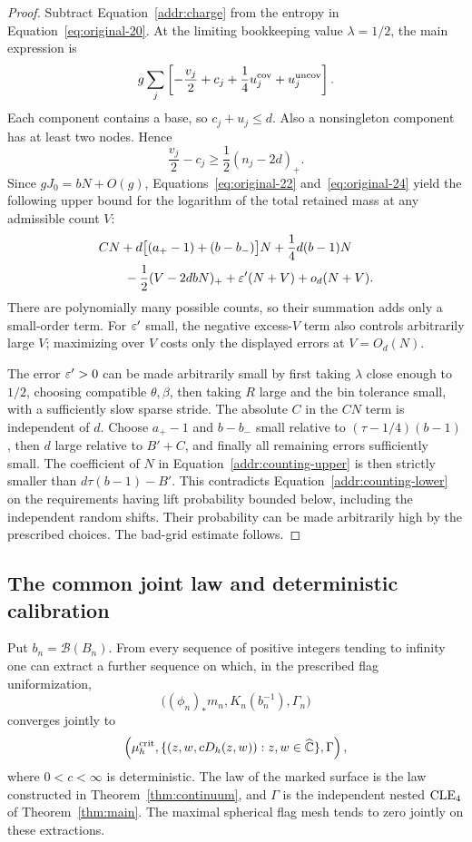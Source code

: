 \begin{proof}
Subtract Equation~\eqref{addr:charge} from the entropy in
Equation~\eqref{eq:original-20}.  At the limiting bookkeeping
value $\lambda=1/2$, the main expression is
\[
 g\sum_j\left[
        -\frac{v_j}{2}+c_j
        +\frac14u_j^{\rm cov}+u_j^{\rm uncov}
          \right].
\]
Each component contains a base, so $c_j+u_j\le d$.
Also a nonsingleton component has at least two nodes.  Hence
\[
             \frac{v_j}{2}-c_j
                    \ge \frac12(n_j-2d)_+.
\]
Since $gJ_0=bN+O(g)$, Equations~\eqref{eq:original-22}
and~\eqref{eq:original-24} yield the following upper bound
for the logarithm of the total retained mass at any admissible
count $V$:
\begin{equation}\label{addr:counting-upper}
\begin{split}
 &CN+d\bigl[(a_+-1)+(b-b_-)\bigr]N
       +\frac14d(b-1)N\\
 &\qquad-\frac12(V-2dbN)_+
       +\varepsilon'(N+V)+o_d(N+V).
\end{split}
\end{equation}
There are polynomially many possible counts, so their summation
adds only a small-order term.  For $\varepsilon'$ small, the negative
excess-$V$ term also controls arbitrarily large $V$; maximizing
over $V$ costs only the displayed errors at $V=O_d(N)$.

The error $\varepsilon'>0$ can be made arbitrarily small by first
taking $\lambda$ close enough to $1/2$, choosing compatible
$\theta,\beta$, then taking $R$ large and the bin tolerance
small, with a sufficiently slow sparse stride.  The absolute
$C$ in the $CN$ term is independent of $d$.
Choose $a_+-1$ and $b-b_-$ small relative to
$(\tau-1/4)(b-1)$, then $d$ large relative to $B'+C$,
and finally all remaining errors sufficiently small.  The
coefficient of $N$ in Equation~\eqref{addr:counting-upper}
is then strictly smaller than
$d\tau(b-1)-B'$.  This contradicts
Equation~\eqref{addr:counting-lower} on the requirements having
lift probability bounded below, including the independent random
shifts.  Their probability can be made arbitrarily high by the
prescribed choices.  The bad-grid estimate follows.
\end{proof}

\subsection{The common joint law and deterministic calibration}

\begin{proposition}
\label{addr:subsequential-joint}
Put $b_n=\mathcal B(B_n)$.  From every sequence of positive
integers tending to infinity one can extract a further sequence
on which, in the prescribed flag uniformization,
\[
 \bigl((\phi_n)_*m_n,K_n(b_n^{-1}),\Gamma_n\bigr)
\]
converges jointly to
\[
 \left(
   \mu_h^{\rm crit},
   \{(z,w,cD_h(z,w)):z,w\in\widehat{\mathbb C}\},
   \Gamma
 \right),
\]
where $0<c<\infty$ is deterministic.  The law of the marked
surface is the law constructed in Theorem~\ref{thm:continuum},
and $\Gamma$ is the independent nested $\mathrm{CLE}_4$ of
Theorem~\ref{thm:main}.  The maximal spherical flag mesh tends
to zero jointly on these extractions.
\end{proposition}

